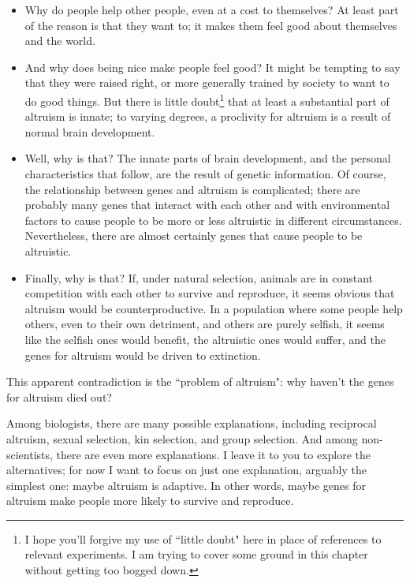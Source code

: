 \documentclass[12pt]{book}
\theoremstyle{exercise}
\begin{document}
\begin{itemize}

\item Why do people help other people, even at a cost to themselves?  At least part of the reason is that they want to; it makes them feel good about themselves and the world.

\item And why does being nice make people feel good?  It might be tempting to say that they were raised right, or more generally trained by society to want to do good things.  But there is little doubt\footnote{I hope you'll forgive my use of ``little doubt" here in place of references to relevant experiments.  I am trying to cover some ground in this chapter without getting too bogged down.} that at least a substantial part of altruism is innate; to varying degrees, a proclivity for altruism is a result of normal brain development.

\item Well, why is that?  The innate parts of brain development, and the personal characteristics that follow, are the result of genetic information.  Of course, the relationship between genes and altruism is complicated;  there are probably many genes that interact with each other and with environmental factors to cause people to be more or less altruistic in different circumstances.  Nevertheless, there are almost certainly genes that cause people to be altruistic.

\item Finally, why is that?  If, under natural selection, animals are in constant competition with each other to survive and reproduce, it seems obvious that altruism would be counterproductive.  In a population where some people help others, even to their own detriment, and others are purely selfish, it seems like the selfish ones would benefit, the altruistic ones would suffer, and the genes for altruism would be driven to extinction.

\end{itemize}

This apparent contradiction is the ``problem of altruism": why haven't the genes for altruism died out?

Among biologists, there are many possible explanations, including reciprocal altruism, sexual selection, kin selection, and group selection.  And among non-scientists, there are even more explanations.  I leave it to you to explore the alternatives; for now I want to focus on just one explanation, arguably the simplest one: maybe altruism is adaptive.  In other words, maybe genes for altruism make people more likely to survive and reproduce.
\end{document}
